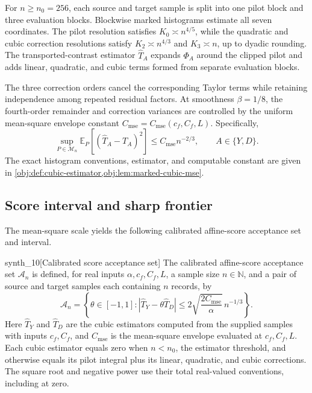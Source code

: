 For \(n\ge n_0=256\), each source and target sample is split into one pilot block and three evaluation blocks. Blockwise marked histograms estimate all seven coordinates. The pilot resolution satisfies \(K_0\asymp n^{4/5}\), while the quadratic and cubic correction resolutions satisfy \(K_2\asymp n^{4/3}\) and \(K_3\asymp n\), up to dyadic rounding. The transported-contrast estimator \(\widehat T_A\) expands \(\Phi_A\) around the clipped pilot and adds linear, quadratic, and cubic terms formed from separate evaluation blocks.

The three correction orders cancel the corresponding Taylor terms while retaining independence among repeated residual factors. At smoothness \(\beta=1/8\), the fourth-order remainder and correction variances are controlled by the uniform mean-square envelope constant \(C_{\mathrm{mse}}=C_{\mathrm{mse}}(c_f,C_f,L)\). Specifically,
\[
\sup_{P\in\mathcal M_n}
\mathbb E_P\!\left[(\widehat T_A-T_A)^2\right]
\le C_{\mathrm{mse}}n^{-2/3},
\qquad A\in\{Y,D\}.
\]
The exact histogram conventions, estimator, and computable constant are given in \cref{obj:def:cubic-estimator,obj:lem:marked-cubic-mse}.

\subsection{Score interval and sharp frontier}

The mean-square scale yields the following calibrated affine-score acceptance set and interval.

\begin{definitionv}{synth_10}[Calibrated score acceptance set]
The calibrated affine-score acceptance set \(\mathcal A_n\) is defined, for real inputs \(\alpha,c_f,C_f,L\), a sample size \(n\in\mathbb N\), and a pair of source and target samples each containing \(n\) records, by
\[
\mathcal A_n
=
\left\{
\theta\in[-1,1]:
\left|\widehat T_Y-\theta\widehat T_D\right|
\le
2\sqrt{\frac{2C_{\mathrm{mse}}}{\alpha}}\,
n^{-1/3}
\right\}.
\]
Here \(\widehat T_Y\) and \(\widehat T_D\) are the cubic estimators computed from the supplied samples with inputs \(c_f,C_f\), and \(C_{\mathrm{mse}}\) is the mean-square envelope evaluated at \(c_f,C_f,L\). Each cubic estimator equals zero when \(n<n_0\), the estimator threshold, and otherwise equals its pilot integral plus its linear, quadratic, and cubic corrections. The square root and negative power use their total real-valued conventions, including at zero.
\end{definitionv}

